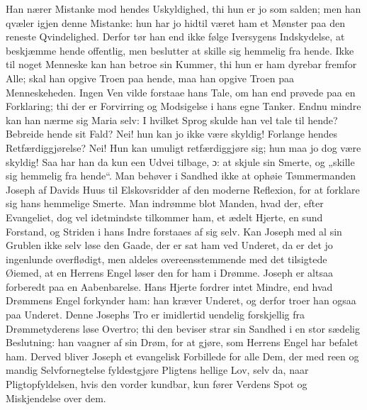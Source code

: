 \documentclass[12pt,a4paper]{book}
\begin{document}
{Han nærer Mistanke mod hendes Uskyldighed, thi hun er jo som
salden; men han qvæler igjen denne Mistanke: hun har jo hidtil været ham et
Mønster paa den reneste Qvindelighed. Derfor tør han end ikke følge Iversygens
Indskydelse, at beskjæmme hende offentlig, men beslutter at skille sig hemmelig
fra hende. Ikke til noget Menneske kan han betroe sin Kummer, thi hun er ham
dyrebar fremfor Alle; skal han opgive Troen paa hende, maa han opgive Troen paa
Menneskeheden. Ingen Ven vilde forstaae hans Tale, om han end prøvede paa en
Forklaring; thi der er Forvirring og Modsigelse i hans egne Tanker. Endnu mindre
kan han nærme sig Maria selv: I hvilket Sprog skulde han vel tale til hende?
Bebreide hende sit Fald? Nei! hun kan jo ikke være skyldig! Forlange hendes
Retfærdiggjørelse? Nei! Hun kan umuligt retfærdiggjøre sig; hun maa jo dog være
skyldig! Saa har han da kun een Udvei tilbage, ɔ: at skjule sin Smerte, og
„skille sig hemmelig fra hende“. Man behøver i Sandhed ikke at ophøie
Tømmermanden Joseph af Davids Huus til Elskovsridder af den moderne Reflexion,
for at forklare sig hans hemmelige Smerte. Man indrømme blot Manden, hvad der,
efter Evangeliet, dog vel idetmindste tilkommer ham, et ædelt Hjerte, en sund
Forstand, og Striden i hans Indre forstaaes af sig selv. Kan Joseph med al sin
Grublen ikke selv løse den Gaade, der er sat ham ved Underet, da er det jo
ingenlunde overflødigt, men aldeles overeensstemmende med det tilsigtede Øiemed,
at en Herrens Engel løser den for ham i Drømme. Joseph er altsaa forberedt paa
en Aabenbarelse. Hans Hjerte fordrer intet Mindre, end hvad Drømmens Engel
forkynder ham: han kræver Underet, og derfor troer han ogsaa paa Underet. Denne
Josephs Tro er imidlertid uendelig forskjellig fra Drømmetyderens løse Overtro;
thi den beviser
strar sin Sandhed i en stor sædelig Beslutning: han vaagner af sin Drøm, for at
gjøre, som Herrens Engel har befalet ham. Derved bliver Joseph et evangelisk
Forbillede for alle Dem, der med reen og mandig Selvfornegtelse fyldestgjøre
Pligtens hellige Lov, selv da, naar Pligtopfyldelsen, hvis den vorder kundbar,
kun fører Verdens Spot og Miskjendelse over dem.}
\end{document}
